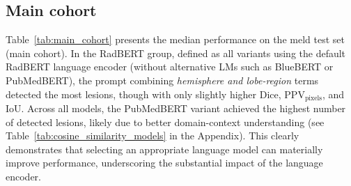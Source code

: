 \documentclass[FCD_GNN.tex]{subfiles}
\begin{document}
\subsection*{Main cohort}

Table~\ref{tab:main_cohort} presents the median performance on the \ac{meld} test set (main cohort).
In the RadBERT group, defined as all variants using the default RadBERT language encoder 
(without alternative LMs such as BlueBERT or PubMedBERT), the prompt combining 
\textit{hemisphere and lobe-region} terms detected the most lesions, though with only slightly higher Dice, PPV$_\text{pixels}$, and IoU.
Across all models, the PubMedBERT variant achieved the highest number of detected lesions, likely due 
to better domain-context understanding (see Table~\ref{tab:cosine_similarity_models} in the Appendix). 
This clearly demonstrates that selecting an appropriate language model can materially improve 
performance, underscoring the substantial impact of the language encoder.
\end{document}
